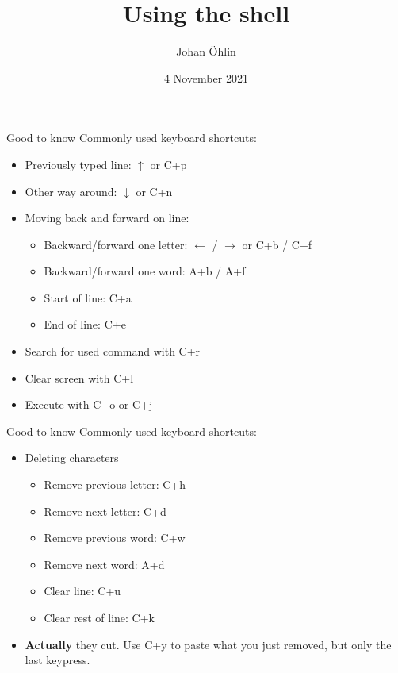 \documentclass{beamer}
\title{Using the shell}
\date{4 November 2021}
\author{Johan Öhlin}
\institute{Yabs}
\let\bf\textbf
\begin{document}
\maketitle

\begin{frame}{Good to know}
        Commonly used keyboard shortcuts: \\
        \begin{itemize}
                \item Previously typed line: $\uparrow$ or C+p
                \item Other way around: $\downarrow$ or C+n
                \item Moving back and forward on line:
                        \begin{itemize}
                                \item Backward/forward one letter: $\leftarrow$ / $\rightarrow$ or C+b / C+f
                                \item Backward/forward one word: A+b / A+f
                                \item Start of line: C+a
                                \item End of line: C+e
                        \end{itemize}
                \item Search for used command with C+r
                \item Clear screen with C+l
                \item Execute with C+o or C+j
        \end{itemize}
\end{frame}

\begin{frame}{Good to know}
        Commonly used keyboard shortcuts: \\
        \begin{itemize}
                \item Deleting characters
                        \begin{itemize}
                                \item Remove previous letter: C+h
                                \item Remove next letter: C+d
                                \item Remove previous word: C+w
                                \item Remove next word: A+d
                                \item Clear line: C+u
                                \item Clear rest of line: C+k
                        \end{itemize}
                \item \bf{Actually} they cut. Use C+y to paste what you just removed, but only the last keypress.
        \end{itemize}
\end{frame}
\end{document}

